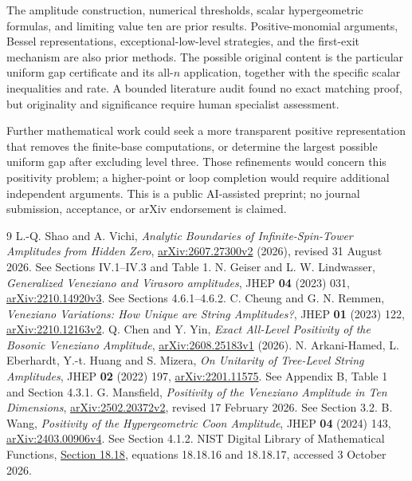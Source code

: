 \documentclass[11pt,a4paper]{article}
\theoremstyle{remark}\newtheorem{remark}[theorem]{Remark}
\begin{document}
The amplitude construction, numerical thresholds, scalar hypergeometric formulas, and limiting value ten are prior results. Positive-monomial arguments, Bessel representations, exceptional-low-level strategies, and the first-exit mechanism are also prior methods. The possible original content is the particular uniform gap certificate and its all-$n$ application, together with the specific scalar inequalities and rate. A bounded literature audit found no exact matching proof, but originality and significance require human specialist assessment.

Further mathematical work could seek a more transparent positive representation that removes the finite-base computations, or determine the largest possible uniform gap after excluding level three. Those refinements would concern this positivity problem; a higher-point or loop completion would require additional independent arguments. This is a public AI-assisted preprint; no journal submission, acceptance, or arXiv endorsement is claimed.

\begin{thebibliography}{9}
\small\setlength{\itemsep}{3pt}
L.-Q. Shao and A. Vichi,
\emph{Analytic Boundaries of Infinite-Spin-Tower Amplitudes from Hidden Zero},
\href{https://arxiv.org/abs/2607.27300v2}{arXiv:2607.27300v2} (2026), revised 31 August 2026. See Sections IV.1--IV.3 and Table 1.
N. Geiser and L. W. Lindwasser,
\emph{Generalized Veneziano and Virasoro amplitudes},
JHEP \textbf{04} (2023) 031,
\href{https://arxiv.org/abs/2210.14920v3}{arXiv:2210.14920v3}. See Sections 4.6.1--4.6.2.
C. Cheung and G. N. Remmen,
\emph{Veneziano Variations: How Unique are String Amplitudes?},
JHEP \textbf{01} (2023) 122,
\href{https://arxiv.org/abs/2210.12163v2}{arXiv:2210.12163v2}.
Q. Chen and Y. Yin,
\emph{Exact All-Level Positivity of the Bosonic Veneziano Amplitude},
\href{https://arxiv.org/abs/2608.25183v1}{arXiv:2608.25183v1} (2026).
N. Arkani-Hamed, L. Eberhardt, Y.-t. Huang and S. Mizera,
\emph{On Unitarity of Tree-Level String Amplitudes},
JHEP \textbf{02} (2022) 197,
\href{https://arxiv.org/abs/2201.11575}{arXiv:2201.11575}.
See Appendix B, Table 1 and Section 4.3.1.
G. Mansfield, \emph{Positivity of the Veneziano Amplitude in Ten Dimensions},
\href{https://arxiv.org/abs/2502.20372v2}{arXiv:2502.20372v2}, revised 17 February 2026. See Section 3.2.
B. Wang, \emph{Positivity of the Hypergeometric Coon Amplitude},
JHEP \textbf{04} (2024) 143,
\href{https://arxiv.org/abs/2403.00906v4}{arXiv:2403.00906v4}.
See Section 4.1.2.
NIST Digital Library of Mathematical Functions,
\href{https://dlmf.nist.gov/18.18}{Section 18.18}, equations 18.18.16 and 18.18.17, accessed 3 October 2026.
\end{thebibliography}
\end{document}

